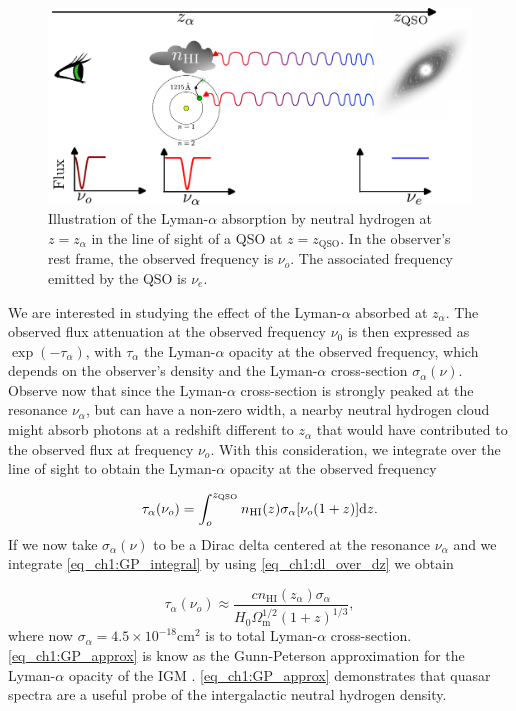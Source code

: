 \begin{figure}[t]
    \centering
    \includegraphics[width=1\linewidth]{img/lyman-alpha.pdf}
    \caption{Illustration of the Lyman-$\alpha$ absorption by neutral hydrogen at $z=z_\alpha$ in the line of sight of a QSO at $z=z_{\text{QSO}}$. In the observer's rest frame, the observed frequency is $\nu_o$. The associated frequency emitted by the QSO is $\nu_e$. }
    \label{fig_ch1:Lyman_alpha_diagram}
\end{figure}
We are interested in studying the effect of the Lyman-$\alpha$ absorbed at $z_\alpha$. The observed flux attenuation at the observed frequency $\nu_0$ is then expressed as $\exp(-\tau_\alpha)$, with $\tau_\alpha$ the Lyman-$\alpha$ opacity at the observed frequency, which depends on the observer's density and the Lyman-$\alpha$ cross-section $\sigma_\alpha(\nu)$. Observe now that since the Lyman-$\alpha$ cross-section is strongly peaked at the resonance $\nu_\alpha$, but can have a non-zero width, a nearby neutral hydrogen cloud might absorb photons at a redshift different to $z_\alpha$ that would have contributed to the observed flux at frequency $\nu_o$. With this consideration, we integrate over the line of sight to obtain the Lyman-$\alpha$ opacity at the observed frequency

\begin{equation}\label{eq_ch1:GP_integral}
    \tau_\alpha(\nu_o)=\int_o^{z_\text{QSO}} n_\text{HI}(z) \sigma_\alpha[\nu_o(1+z)] \differential z.
\end{equation}
If we now take $\sigma_\alpha(\nu)$ to be a Dirac delta centered at the resonance $\nu_\alpha$ and we integrate \cref{eq_ch1:GP_integral} by using \ref{eq_ch1:dl_over_dz} we obtain

\begin{equation}\label{eq_ch1:GP_approx}
    \tau_\alpha(\nu_o)\approx \frac{cn_\text{HI}(z_\alpha)\sigma_\alpha}{H_0\Omega_\text{m}^{1/2} (1+z)^{1/3}},
\end{equation}
where now $\sigma_\alpha=4.5 \times 10^{-18}$cm$^2$ is to total Lyman-$\alpha$ cross-section.
\cref{eq_ch1:GP_approx} is know as the Gunn-Peterson approximation for the Lyman-$\alpha$ opacity of the IGM \cite{GunnPeterson}. \cref{eq_ch1:GP_approx} demonstrates that quasar spectra are a useful probe of the intergalactic neutral hydrogen density.

